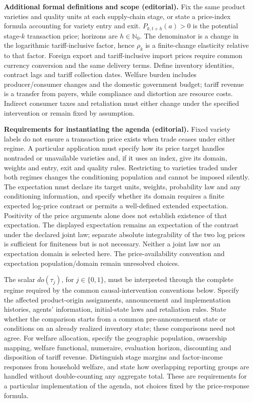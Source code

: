 \documentclass[11pt,a4paper]{article}
\begin{document}
\textbf{Additional formal definitions and scope (editorial).} Fix the same product varieties and quality units at each supply-chain stage, or state a price-index formula accounting for variety entry and exit. \(P_{k,t+h}(a)>0\) is the potential stage-\(k\) transaction price; horizons are \(h\in\mathbb N_0\). The denominator is a change in the logarithmic tariff-inclusive factor, hence \(\rho_k\) is a finite-change elasticity relative to that factor. Foreign export and tariff-inclusive import prices require common currency conversion and the same delivery terms. Define inventory identities, contract lags and tariff collection dates. Welfare burden includes producer/consumer changes and the domestic government budget; tariff revenue is a transfer from payers, while compliance and distortion are resource costs. Indirect consumer taxes and retaliation must either change under the specified intervention or remain fixed by assumption.

\textbf{Requirements for instantiating the agenda (editorial).} Fixed variety labels do not ensure a transaction price exists when trade ceases under either regime. A particular application must specify how its price target handles nontraded or unavailable varieties and, if it uses an index, give its domain, weights and entry, exit and quality rules. Restricting to varieties traded under both regimes changes the conditioning population and cannot be imposed silently. The expectation must declare its target units, weights, probability law and any conditioning information, and specify whether its domain requires a finite expected log-price contrast or permits a well-defined extended expectation. Positivity of the price arguments alone does not establish existence of that expectation. The displayed expectation remains an expectation of the contrast under the declared joint law; separate absolute integrability of the two log prices is sufficient for finiteness but is not necessary. Neither a joint law nor an expectation domain is selected here. The price-availability convention and expectation population/domain remain unresolved choices.

The scalar \(do(\tau_j)\), for \(j\in\{0,1\}\), must be interpreted through the complete regime required by the common causal-intervention conventions below. Specify the affected product-origin assignments, announcement and implementation histories, agents' information, initial-state laws and retaliation rules. State whether the comparison starts from a common pre-announcement state or conditions on an already realized inventory state; these comparisons need not agree. For welfare allocation, specify the geographic population, ownership mapping, welfare functional, numeraire, evaluation horizon, discounting and disposition of tariff revenue. Distinguish stage margins and factor-income responses from household welfare, and state how overlapping reporting groups are handled without double-counting any aggregate total. These are requirements for a particular implementation of the agenda, not choices fixed by the price-response formula.
\end{document}
